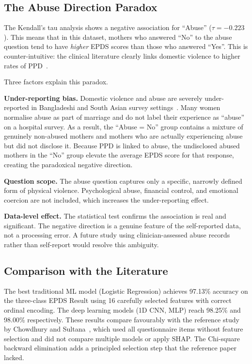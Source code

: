 \subsection{The Abuse Direction Paradox}
\label{ch4-subsec-abuse}

The Kendall's tau analysis shows a negative association for ``Abuse'' ($\tau = -0.223$).
This means that in this dataset, mothers who answered ``No'' to the abuse question tend to have \textit{higher} EPDS scores than those who answered ``Yes''.
This is counter-intuitive: the clinical literature clearly links domestic violence to higher rates of PPD~\cite{islam2017ipv}.

Three factors explain this paradox.

\textbf{Under-reporting bias.}
Domestic violence and abuse are severely under-reported in Bangladeshi and South Asian survey settings~\cite{islam2017ipv}.
Many women normalise abuse as part of marriage and do not label their experience as ``abuse'' on a hospital survey.
As a result, the ``Abuse = No'' group contains a mixture of genuinely non-abused mothers and mothers who are actually experiencing abuse but did not disclose it.
Because PPD is linked to abuse, the undisclosed abused mothers in the ``No'' group elevate the average EPDS score for that response, creating the paradoxical negative direction.

\textbf{Question scope.}
The abuse question captures only a specific, narrowly defined form of physical violence.
Psychological abuse, financial control, and emotional coercion are not included, which increases the under-reporting effect.

\textbf{Data-level effect.}
The statistical test confirms the association is real and significant.
The negative direction is a genuine feature of the self-reported data, not a processing error.
A future study using clinician-assessed abuse records rather than self-report would resolve this ambiguity.

\subsection{Comparison with the Literature}
\label{ch4-subsec-litcomp}

The best traditional ML model (Logistic Regression) achieves 97.13\% accuracy on the three-class EPDS Result using 16 carefully selected features with correct ordinal encoding.
The deep learning models (1D CNN, MLP) reach 98.25\% and 98.00\% respectively.
These results compare favourably with the reference study by Chowdhury and Sultana~\cite{chowdhury2026assessing}, which used all questionnaire items without feature selection and did not compare multiple models or apply SHAP.
The Chi-square backward elimination adds a principled selection step that the reference paper lacked.


